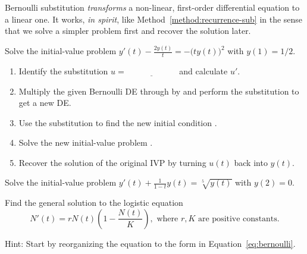 \documentclass[../main.tex]{subfiles}
\begin{document}
\clearpage

Bernoulli substitution \emph{transforms} a non-linear, first-order differential equation to a linear one. It works, \emph{in spirit}, like Method~\ref{method:recurrence-sub} in the sense that we solve a simpler problem first and recover the solution later.
\begin{example} \label{ex:bernoulli-worked}
  Solve the initial-value problem \(y'(t) - \frac{2 y(t)}{t}  = -\big( ty(t) \big)^{2}\) with \(y(1) = 1/2\).


  \begin{enumerate}[wide, label=Step~(\arabic*).]
    \item Identify the substitution \(u = \underline{\hspace{1in}}\) and calculate \(u'\).


    \item Multiply the given Bernoulli DE through by \underline{\hspace{1in}} and perform the substitution to get a new DE.


    \item Use the substitution to find the new initial condition \underline{\hspace{2in}}.

    \item Solve the new initial-value problem \underline{\hspace{3in}}.


    \item Recover the solution of the original IVP by turning \(u(t)\) back into \(y(t)\).

      \blanks*
  \end{enumerate}
\end{example}
\clearpage

\begin{example} \label{ex:bernoulli-fifth-root}
  Solve the initial-value problem \(y'(t) + \frac{1}{1 - t} y(t)  = \sqrt[5]{y(t)}\) with \(y(2) = 0\).

  \blanks*
\end{example}
\clearpage

\begin{exercise} \label{ex:bernoulli-logistic}
  Find the general solution to the logistic equation
  \[
    N'(t) = rN(t) \left( 1 - \frac{N(t)}{K} \right), \text{ where \(r,K\) are positive constants}.
  \]

  {\footnotesize Hint: Start by reorganizing the equation to the form in Equation~\eqref{eq:bernoulli}.}

  \blanks*
\end{exercise}
\clearpage
\end{document}
